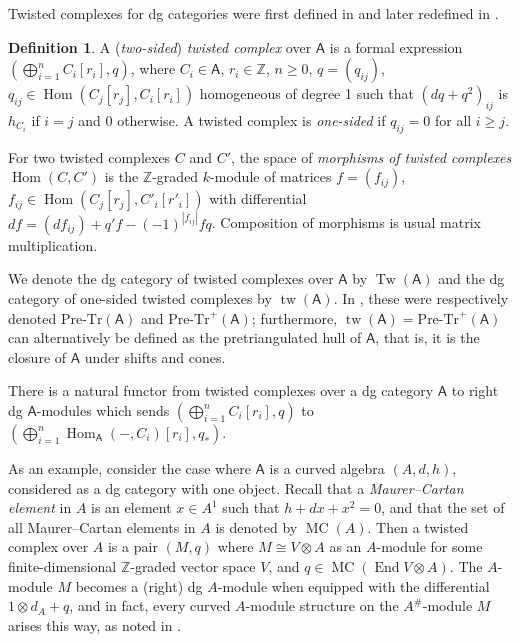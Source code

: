 \documentclass[a4paper]{amsart}
\theoremstyle{plain}
\theoremstyle{definition}
\newtheorem{defn}[thm]{Definition}
\theoremstyle{remark}
\DeclareMathOperator{\End}{End}
\DeclareMathOperator{\Hom}{Hom}
\DeclareMathOperator{\MC}{MC}
\DeclareMathOperator{\tw}{tw}
\DeclareMathOperator{\Tw}{Tw}
\newcommand{\cat}[1]{\mathsf{#1}}
\numberwithin{equation}{section}
\theoremstyle{plain}
\begin{document}
	Twisted complexes for dg categories were first defined in \cite{bk91} and later redefined in \cite{bll04}.
	
	\begin{defn}
		A (\emph{two-sided}) \emph{twisted complex} over $\cat{A}$ is a formal expression $(\bigoplus_{i=1}^n C_i[r_i], q)$, where $C_i \in \cat{A}$, $r_i \in \mathbb{Z}$, $n \geq 0$, $q=(q_{ij})$, $q_{ij} \in \Hom(C_j[r_j], C_i[r_i])$ homogeneous of degree 1 such that $(dq+q^2)_{ij}$ is $h_{C_i}$ if $i=j$ and 0 otherwise. 
		A twisted complex is \emph{one-sided} if $q_{ij} = 0$ for all $i \ge j$.
		
		For two twisted complexes $C$ and $C'$, the space of \emph{morphisms of twisted complexes} $\Hom(C,C')$ is the $\mathbb{Z}$-graded $k$-module of matrices $f=(f_{ij})$, $f_{ij} \in \Hom(C_j[r_j], C'_i[r'_i])$ with differential 
		$df = (df_{ij}) + q'f -(-1)^{|f_{ij}|}fq$. 
		Composition of morphisms is usual matrix multiplication.
	\end{defn}

	We denote the dg category of twisted complexes over $\cat{A}$ by $\Tw(\cat{A})$ and the dg category of one-sided twisted complexes by $\tw(\cat{A})$.
	In \cite{bk91}, these were respectively denoted $\text{Pre-Tr}(\cat{A})$ and $\text{Pre-Tr}^+\!(\cat{A})$; furthermore, $\tw(\cat A) = \text{Pre-Tr}^+\!(\cat{A})$ can alternatively be defined as the pretriangulated hull of $\cat{A}$, that is, it is the closure of $\cat{A}$ under shifts and cones. 
	
	There is a natural functor from twisted complexes over a dg category $\cat{A}$ to right dg $\cat{A}$-modules which sends $(\bigoplus_{i=1}^n C_i[r_i], q)$ to $(\bigoplus_{i=1}^n \Hom_{\cat{A}}(-, C_i)[r_i], q_*)$.
	
	As an example, consider the case where $\cat{A}$ is a curved algebra $(A,d,h)$, considered as a dg category with one object.
	Recall that a \emph{Maurer--Cartan element} in $A$ is an element $x \in A^1$ such that $h + dx+x^2 = 0$, and that the set of all Maurer--Cartan elements in $A$ is denoted by $\MC(A)$.
	Then a twisted complex over $A$ is a pair $(M, q)$ where $M \cong V \otimes A$ as an $A$-module for some finite-dimensional $\mathbb{Z}$-graded vector space $V$, and $q \in \MC(\End V \otimes A)$.
	The $A$-module $M$ becomes a (right) dg $A$-module when equipped with the differential $1 \otimes d_A + q$, and in fact, every curved $A$-module structure on the $A^\#$-module $M$ arises this way, as noted in \cite[Remark 3.2]{chl21}.
	
\end{document}
